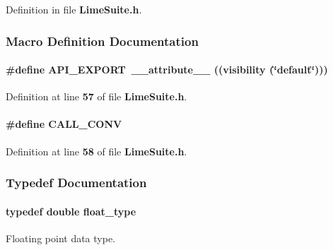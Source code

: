 Definition in file {\bf Lime\+Suite.\+h}.



\subsubsection{Macro Definition Documentation}
\paragraph[{A\+P\+I\+\_\+\+E\+X\+P\+O\+RT}]{\setlength{\rightskip}{0pt plus 5cm}\#define A\+P\+I\+\_\+\+E\+X\+P\+O\+RT~{\bf \+\_\+\+\_\+attribute\+\_\+\+\_\+} ((visibility (\char`\"{}default\char`\"{})))}\label{LimeSuite_8h_a5e3652cae8b48c1ad174f0b06bbd06d0}


Definition at line {\bf 57} of file {\bf Lime\+Suite.\+h}.

\paragraph[{C\+A\+L\+L\+\_\+\+C\+O\+NV}]{\setlength{\rightskip}{0pt plus 5cm}\#define C\+A\+L\+L\+\_\+\+C\+O\+NV}\label{LimeSuite_8h_a66285a1fe575693f5f275b212891222e}


Definition at line {\bf 58} of file {\bf Lime\+Suite.\+h}.



\subsubsection{Typedef Documentation}
\paragraph[{float\+\_\+type}]{\setlength{\rightskip}{0pt plus 5cm}typedef double {\bf float\+\_\+type}}\label{LimeSuite_8h_a25d00a4a2950431bf70b51adcc7cb430}


Floating point data type. 



